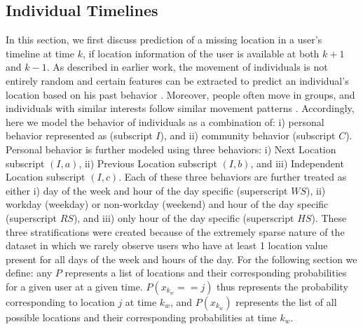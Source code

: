 \subsection{Individual Timelines}
In this section, we first discuss prediction of a missing location in a user's timeline at time $k$, if location information of the user is available at both $k+1$ and $k-1$.
As described in earlier work, the movement of individuals is not entirely random and certain features can be extracted to predict an individual's location based on his past behavior \cite{57}. Moreover, people often move in groups, and individuals with similar interests follow similar movement patterns \cite{81}. Accordingly, here we model the behavior of individuals as a combination of: i) personal behavior represented as (subscript $I$), and ii) community behavior (subscript $C$). Personal behavior is further modeled using three behaviors: i) Next Location subscript $(I,a)$, ii) Previous Location subscript $(I,b)$, and iii) Independent Location subscript $(I,c)$. Each of these three behaviors are further treated as either i) day of the week and hour of the day specific (superscript $WS$), ii) workday (weekday) or non-workday (weekend) and hour of the day specific (superscript $RS$), and iii) only hour of the day specific (superscript $HS$). These three stratifications were created because of the extremely sparse nature of the dataset in which we rarely observe users who have at least 1 location value present for all days of the week and hours of the day. 
For the following section we define: any $P$ represents a list of locations and their corresponding probabilities for a given user at a given time. $P(x_{k_w}==j)$ thus represents the probability corresponding to location $j$ at time $k_w$, and $P(x_{k_w})$ represents the list of all possible locations and their corresponding probabilities at time $k_{w}$. 

